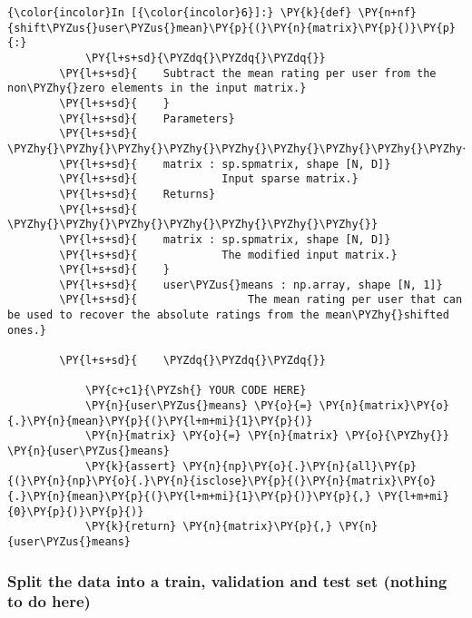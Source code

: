     \begin{Verbatim}[commandchars=\\\{\}]
{\color{incolor}In [{\color{incolor}6}]:} \PY{k}{def} \PY{n+nf}{shift\PYZus{}user\PYZus{}mean}\PY{p}{(}\PY{n}{matrix}\PY{p}{)}\PY{p}{:}
            \PY{l+s+sd}{\PYZdq{}\PYZdq{}\PYZdq{}}
        \PY{l+s+sd}{    Subtract the mean rating per user from the non\PYZhy{}zero elements in the input matrix.}
        \PY{l+s+sd}{    }
        \PY{l+s+sd}{    Parameters}
        \PY{l+s+sd}{    \PYZhy{}\PYZhy{}\PYZhy{}\PYZhy{}\PYZhy{}\PYZhy{}\PYZhy{}\PYZhy{}\PYZhy{}\PYZhy{}}
        \PY{l+s+sd}{    matrix : sp.spmatrix, shape [N, D]}
        \PY{l+s+sd}{             Input sparse matrix.}
        \PY{l+s+sd}{    Returns}
        \PY{l+s+sd}{    \PYZhy{}\PYZhy{}\PYZhy{}\PYZhy{}\PYZhy{}\PYZhy{}\PYZhy{}}
        \PY{l+s+sd}{    matrix : sp.spmatrix, shape [N, D]}
        \PY{l+s+sd}{             The modified input matrix.}
        \PY{l+s+sd}{    }
        \PY{l+s+sd}{    user\PYZus{}means : np.array, shape [N, 1]}
        \PY{l+s+sd}{                 The mean rating per user that can be used to recover the absolute ratings from the mean\PYZhy{}shifted ones.}
        
        \PY{l+s+sd}{    \PYZdq{}\PYZdq{}\PYZdq{}}
              
            \PY{c+c1}{\PYZsh{} YOUR CODE HERE}
            \PY{n}{user\PYZus{}means} \PY{o}{=} \PY{n}{matrix}\PY{o}{.}\PY{n}{mean}\PY{p}{(}\PY{l+m+mi}{1}\PY{p}{)}
            \PY{n}{matrix} \PY{o}{=} \PY{n}{matrix} \PY{o}{\PYZhy{}} \PY{n}{user\PYZus{}means}
            \PY{k}{assert} \PY{n}{np}\PY{o}{.}\PY{n}{all}\PY{p}{(}\PY{n}{np}\PY{o}{.}\PY{n}{isclose}\PY{p}{(}\PY{n}{matrix}\PY{o}{.}\PY{n}{mean}\PY{p}{(}\PY{l+m+mi}{1}\PY{p}{)}\PY{p}{,} \PY{l+m+mi}{0}\PY{p}{)}\PY{p}{)}
            \PY{k}{return} \PY{n}{matrix}\PY{p}{,} \PY{n}{user\PYZus{}means}
\end{Verbatim}

    \hypertarget{split-the-data-into-a-train-validation-and-test-set-nothing-to-do-here}{%
\subsubsection{Split the data into a train, validation and test set
(nothing to do
here)}\label{split-the-data-into-a-train-validation-and-test-set-nothing-to-do-here}}

